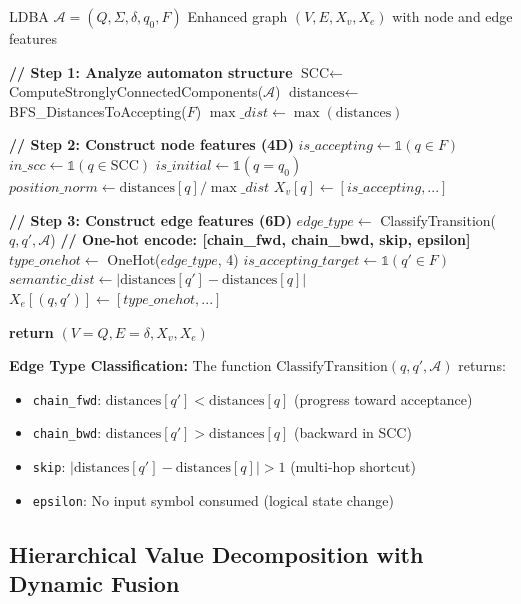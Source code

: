 \documentclass{article}
\begin{document}
\begin{algorithm}[h]
\caption{SE-GNN Graph Construction}
\label{alg:segnn}
\begin{algorithmic}[1]
\REQUIRE LDBA $\mathcal{A} = (Q, \Sigma, \delta, q_0, F)$
\ENSURE Enhanced graph $(V, E, X_v, X_e)$ with node and edge features

\STATE \textbf{// Step 1: Analyze automaton structure}
\STATE $\text{SCC} \gets$ ComputeStronglyConnectedComponents($\mathcal{A}$)
\STATE $\text{distances} \gets$ BFS\_DistancesToAccepting($F$)
\STATE $\max\_dist \gets \max(\text{distances})$

\STATE \textbf{// Step 2: Construct node features (4D)}
    \STATE $is\_accepting \gets \mathbb{1}(q \in F)$
    \STATE $in\_scc \gets \mathbb{1}(q \in \text{SCC})$
    \STATE $is\_initial \gets \mathbb{1}(q = q_0)$
    \STATE $position\_norm \gets \text{distances}[q] / \max\_dist$
    \STATE $X_v[q] \gets [is\_accepting, ...]$
\ENDFOR

\STATE \textbf{// Step 3: Construct edge features (6D)}
    \STATE $edge\_type \gets$ ClassifyTransition($q, q', \mathcal{A}$)
    \STATE \textbf{// One-hot encode: [chain\_fwd, chain\_bwd, skip, epsilon]}
    \STATE $type\_onehot \gets$ OneHot($edge\_type$, 4)
    \STATE $is\_accepting\_target \gets \mathbb{1}(q' \in F)$
    \STATE $semantic\_dist \gets |\text{distances}[q'] - \text{distances}[q]|$
    \STATE $X_e[(q, q')] \gets [type\_onehot, ...]$
\ENDFOR

\STATE \textbf{return} $(V=Q, E=\delta, X_v, X_e)$
\end{algorithmic}
\end{algorithm}

\textbf{Edge Type Classification:} The function $\text{ClassifyTransition}(q, q', \mathcal{A})$ returns:
\begin{itemize}
\item \texttt{chain\_fwd}: $\text{distances}[q'] < \text{distances}[q]$ (progress toward acceptance)
\item \texttt{chain\_bwd}: $\text{distances}[q'] > \text{distances}[q]$ (backward in SCC)
\item \texttt{skip}: $|\text{distances}[q'] - \text{distances}[q]| > 1$ (multi-hop shortcut)
\item \texttt{epsilon}: No input symbol consumed (logical state change)
\end{itemize}

\subsection{Hierarchical Value Decomposition with Dynamic Fusion}
\end{document}

